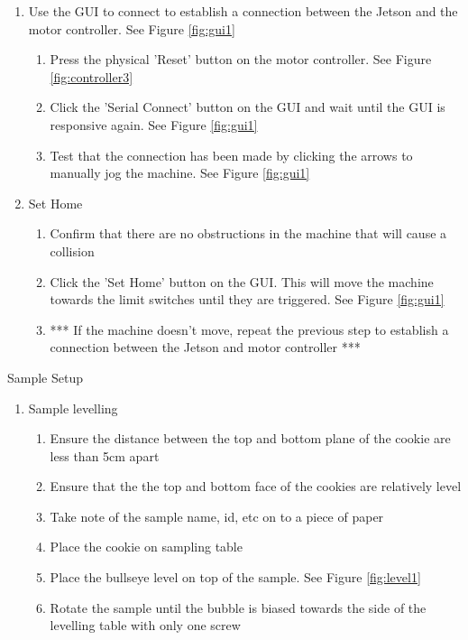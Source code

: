 \documentclass{article}
\begin{document}
\begin{outline}[enumerate]
\begin{enumerate}
\begin{enumerate}
\begin{enumerate}
            \end{enumerate}
        \end{enumerate}
    \item Use the GUI to connect to establish a connection between the Jetson and the motor controller. See Figure \ref{fig:gui1}
        \begin{enumerate}
        \item Press the physical 'Reset' button on the motor controller. See Figure \ref{fig:controller3}
        \item Click the 'Serial Connect' button on the GUI and wait until the GUI is responsive again.  See Figure \ref{fig:gui1}
        \item Test that the connection has been made by clicking the arrows to manually jog the machine. See Figure \ref{fig:gui1}
        \end{enumerate}
    \item Set Home
        \begin{enumerate}
        \item Confirm that there are no obstructions in the machine that will cause a collision
        \item Click the 'Set Home' button on the GUI. This will move the machine towards the limit switches until they are triggered.  See Figure \ref{fig:gui1}
        \item *** If the machine doesn't move, repeat the previous step to establish a connection between the Jetson and motor controller ***
        \end{enumerate}
\end{enumerate}
\item Sample Setup
	\begin{enumerate}
	\item Sample levelling
		\begin{enumerate}
        \item Ensure the distance between the top and bottom plane of the cookie are less than 5cm apart
		\item Ensure that the the top and bottom face of the cookies are relatively level
        \item Take note of the sample name, id, etc on to a piece of paper
		\item Place the cookie on sampling table
		\item Place the bullseye level on top of the sample. See Figure \ref{fig:level1}
        \item Rotate the sample until the bubble is biased towards the side of the levelling table with only one screw

\end{enumerate}
\end{enumerate}
\end{outline}
\end{document}
